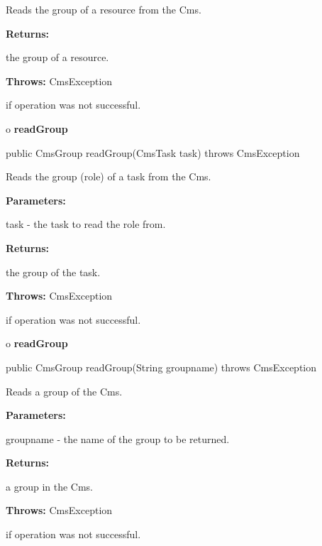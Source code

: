 \begin{description}
\htmlDD Reads the group of a resource from the Cms.

\begin{description}
\item {\bf Returns:}

the group of a resource.
\item {\bf Throws:} CmsException

if operation was not successful.
\end{description}

\end{description}

o {\bf readGroup}

\begin{PRE}
 public CmsGroup readGroup(CmsTask task) throws CmsException
\end{PRE}

\begin{description}
\htmlDD Reads the group (role) of a task from the Cms.

\begin{description}
\item {\bf Parameters:}

task - the task to read the role from.
\item {\bf Returns:}

the group of the task.
\item {\bf Throws:} CmsException

if operation was not successful.
\end{description}

\end{description}

o {\bf readGroup}

\begin{PRE}
 public CmsGroup readGroup(String groupname) throws CmsException
\end{PRE}

\begin{description}
\htmlDD Reads a group of the Cms.

\begin{description}
\item {\bf Parameters:}

groupname - the name of the group to be returned.
\item {\bf Returns:}

a group in the Cms.
\item {\bf Throws:} CmsException

if operation was not successful.
\end{description}

\end{description}

